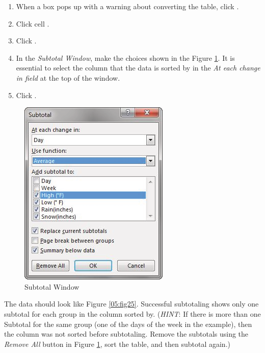 \begin{enumerate}[resume]
	\item When a box pops up with a warning about converting the table, click .
	\item Click cell .
	\item Click .
	\item In the \textit{Subtotal Window}, make the choices shown in the Figure \ref{05:fig24}. It is essential to select the column that the data is sorted by in the \textit{At each change in field} at the top of the window. 
	\item Click .
\end{enumerate}

\begin{figure}[H]
	\centering
	\includegraphics[width=\maxwidth{.95\linewidth}]{gfx/ch05_fig24}
	\caption{Subtotal Window}
	\label{05:fig24}
\end{figure}

The data should look like Figure \ref{05:fig25}. Successful subtotaling shows only one subtotal for each group in the column sorted by. (\textit{HINT}: If there is more than one Subtotal for the same group (\ie one of the days of the week in the example), then the column was not sorted before subtotaling. Remove the subtotals using the \textit{Remove All} button in Figure \ref{05:fig24}, sort the table, and then subtotal again.)

